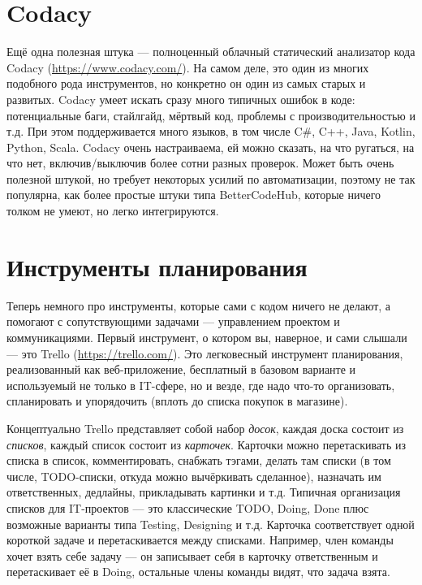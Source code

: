 \documentclass[a5paper]{article}
\begin{document}
\section{Codacy}

Ещё одна полезная штука --- полноценный облачный статический анализатор кода Codacy (\url{https://www.codacy.com/}). На самом деле, это один из многих подобного рода инструментов, но конкретно он один из самых старых и развитых. Codacy умеет искать сразу много типичных ошибок в коде: потенциальные баги, стайлгайд, мёртвый код, проблемы с производительностью и т.д. При этом поддерживается много языков, в том числе C\#, C++, Java, Kotlin, Python, Scala. Codacy очень настраиваема, ей можно сказать, на что ругаться, на что нет, включив/выключив более сотни разных проверок. Может быть очень полезной штукой, но требует некоторых усилий по автоматизации, поэтому не так популярна, как более простые штуки типа BetterCodeHub, которые ничего толком не умеют, но легко интегрируются.

\section{Инструменты планирования}

Теперь немного про инструменты, которые сами с кодом ничего не делают, а помогают с сопутствующими задачами --- управлением проектом и коммуникациями. Первый инструмент, о котором вы, наверное, и сами слышали --- это Trello (\url{https://trello.com/}). Это легковесный инструмент планирования, реализованный как веб-приложение, бесплатный в базовом варианте и используемый не только в IT-сфере, но и везде, где надо что-то организовать, спланировать и упорядочить (вплоть до списка покупок в магазине).

Концептуально Trello представляет собой набор \textit{досок}, каждая доска состоит из \textit{списков}, каждый список состоит из \textit{карточек}. Карточки можно перетаскивать из списка в список, комментировать, снабжать тэгами, делать там списки (в том числе, TODO-списки, откуда можно вычёркивать сделанное), назначать им ответственных, дедлайны, прикладывать картинки и т.д. Типичная организация списков для IT-проектов --- это классические TODO, Doing, Done плюс возможные варианты типа Testing, Designing и т.д. Карточка соответствует одной короткой задаче и перетаскивается между списками. Например, член команды хочет взять себе задачу --- он записывает себя в карточку ответственным и перетаскивает её в Doing, остальные члены команды видят, что задача взята.
\end{document}
